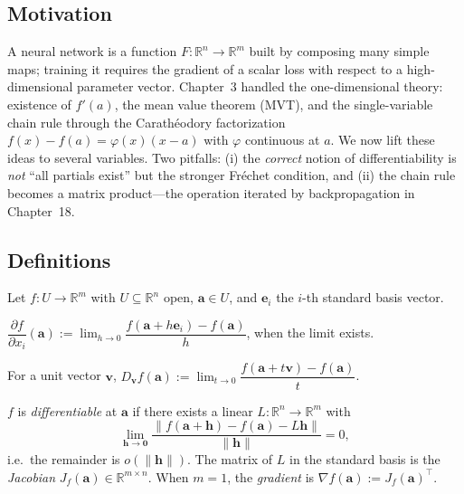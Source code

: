 \subsection*{Motivation}

A neural network is a function $F:\mathbb{R}^n\to\mathbb{R}^m$ built by composing many simple maps; training it requires the gradient of a scalar loss with respect to a high-dimensional parameter vector. Chapter~3 handled the one-dimensional theory: existence of $f'(a)$, the mean value theorem (MVT), and the single-variable chain rule through the Carath\'eodory factorization $f(x)-f(a)=\varphi(x)(x-a)$ with $\varphi$ continuous at $a$. We now lift these ideas to several variables. Two pitfalls: (i) the \emph{correct} notion of differentiability is \emph{not} ``all partials exist'' but the stronger Fr\'echet condition, and (ii) the chain rule becomes a matrix product---the operation iterated by backpropagation in Chapter~18.

\subsection*{Definitions}

Let $f:U\to\mathbb{R}^m$ with $U\subseteq\mathbb{R}^n$ open, $\mathbf{a}\in U$, and $\mathbf{e}_i$ the $i$-th standard basis vector.

\begin{definition}
$\dfrac{\partial f}{\partial x_i}(\mathbf{a}) := \lim_{h\to 0}\dfrac{f(\mathbf{a}+h\mathbf{e}_i)-f(\mathbf{a})}{h}$, when the limit exists.
\end{definition}

\begin{definition}
For a unit vector $\mathbf{v}$, $D_\mathbf{v} f(\mathbf{a}):=\lim_{t\to 0}\dfrac{f(\mathbf{a}+t\mathbf{v})-f(\mathbf{a})}{t}$.
\end{definition}

\begin{definition}
$f$ is \emph{differentiable} at $\mathbf{a}$ if there exists a linear $L:\mathbb{R}^n\to\mathbb{R}^m$ with
\[
\lim_{\mathbf{h}\to\mathbf{0}}\frac{\|f(\mathbf{a}+\mathbf{h})-f(\mathbf{a})-L\mathbf{h}\|}{\|\mathbf{h}\|}=0,
\]
i.e.\ the remainder is $o(\|\mathbf{h}\|)$. The matrix of $L$ in the standard basis is the \emph{Jacobian} $J_f(\mathbf{a})\in\mathbb{R}^{m\times n}$. When $m=1$, the \emph{gradient} is $\nabla f(\mathbf{a}):=J_f(\mathbf{a})^\top$.
\end{definition}

